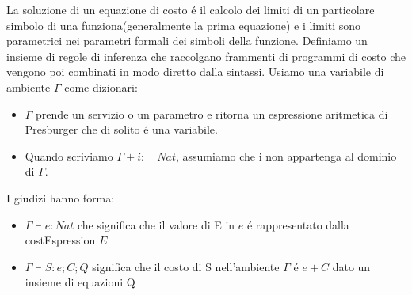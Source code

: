 \documentclass[../../main.tex]{subfiles}
\begin{document}
La soluzione di un equazione di costo é il calcolo dei limiti di un particolare simbolo di una funziona(generalmente la prima equazione) e i limiti sono parametrici nei parametri formali dei simboli della funzione.
Definiamo un insieme di regole di inferenza che raccolgano frammenti di programmi di costo che vengono poi combinati in modo diretto dalla sintassi.
Usiamo una variabile di ambiente $ \varGamma $ come dizionari:
\begin{itemize}
    \item $\varGamma$ prende un servizio o un parametro e ritorna un espressione aritmetica di Presburger che di solito é una variabile.
    \item Quando scriviamo $\varGamma + i : \quad Nat $, assumiamo che i non appartenga al dominio di $\varGamma$.
\end{itemize}
I giudizi hanno forma:
\begin{itemize}
    \item $\varGamma \vdash e : Nat$ che significa che il valore di E in $e$ é rappresentato dalla costEspression $E$
    \item $\varGamma \vdash S : e ; C; Q $ significa che il costo di S nell'ambiente $\varGamma$ é $e + C$ dato un insieme di equazioni Q
\end{itemize}
\end{document}
